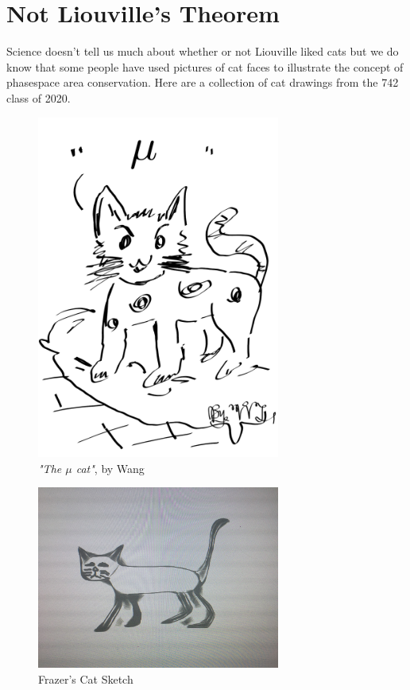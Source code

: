 \section{Not Liouville's Theorem}
Science doesn't tell us much about whether or not Liouville liked cats but we do know that some people have used pictures of cat faces to illustrate the concept of phasespace area conservation. 
Here are a collection of cat drawings from the 742 class of 2020.

\begin{centering}
\begin{figure}\centering
	\includegraphics[width=8cm]{mucat.pdf}
  \caption{\textsl{"The $\mu$ cat"}, by Wang}
  \label{fig:cat1}
\end{figure}

\begin{figure}
	\includegraphics[width=8cm]{catsketch.pdf}
  \caption{Frazer's Cat Sketch}
  \label{fig:catsketch}
\end{figure}


\end{centering}
